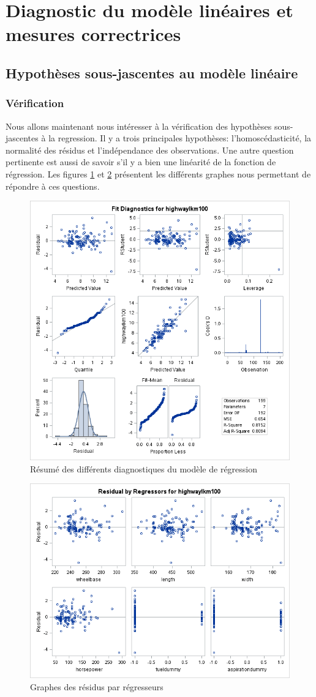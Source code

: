 \documentclass[11pt,a4paper]{article}
\begin{document}
\section{Diagnostic du modèle linéaires et mesures correctrices}
\subsection{Hypothèses sous-jascentes au modèle linéaire}
\subsubsection{Vérification}
Nous allons maintenant nous intéresser à la vérification des hypothèses sous-jascentes à la regression.
Il y a trois principales hypothèses: l'homoscédasticité, la normalité des résidus et l'indépendance des observations. 
Une autre question pertinente est aussi de savoir s'il y a bien une linéarité de la fonction de régression. Les figures \ref{fig:diagnostics} et \ref{fig:regressors} présentent les différents graphes nous permettant de répondre à ces questions.
\begin{figure}
	\centering
	\includegraphics[width=0.8\linewidth]{fitdiagnostics}
	\caption{Résumé des différents diagnostiques du modèle de régression}
	\label{fig:diagnostics}
\end{figure}
\begin{figure}
	\centering
	\includegraphics[width=0.8\linewidth]{resbyregressors}
	\caption{Graphes des résidus par régresseurs}
	\label{fig:regressors}
\end{figure}
\end{document}
